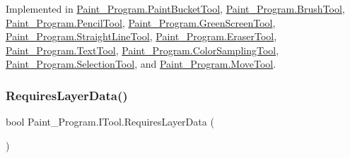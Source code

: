 Implemented in \mbox{\hyperlink{class_paint___program_1_1_paint_bucket_tool_a3841a712dff7c2887a4518d7602b627e}{Paint\+\_\+\+Program.\+Paint\+Bucket\+Tool}}, \mbox{\hyperlink{class_paint___program_1_1_brush_tool_a20c7beba691866bed3cea6a63400d005}{Paint\+\_\+\+Program.\+Brush\+Tool}}, \mbox{\hyperlink{class_paint___program_1_1_pencil_tool_ad59c1709d381a33f8363fd15f526eb0e}{Paint\+\_\+\+Program.\+Pencil\+Tool}}, \mbox{\hyperlink{class_paint___program_1_1_green_screen_tool_ad6be969ae981c34f5677e8a5bd537ef6}{Paint\+\_\+\+Program.\+Green\+Screen\+Tool}}, \mbox{\hyperlink{class_paint___program_1_1_straight_line_tool_ab823dd700a2a92df78fe73b25c129c14}{Paint\+\_\+\+Program.\+Straight\+Line\+Tool}}, \mbox{\hyperlink{class_paint___program_1_1_eraser_tool_aac92273a8f10a9f9cee6e03b1337f1c5}{Paint\+\_\+\+Program.\+Eraser\+Tool}}, \mbox{\hyperlink{class_paint___program_1_1_text_tool_a0b77db4478e19cd1f957c37af981fbf5}{Paint\+\_\+\+Program.\+Text\+Tool}}, \mbox{\hyperlink{class_paint___program_1_1_color_sampling_tool_a3365d954290cfb30d73c8a7c50fa7b72}{Paint\+\_\+\+Program.\+Color\+Sampling\+Tool}}, \mbox{\hyperlink{class_paint___program_1_1_selection_tool_aa271d61b0d9c182e9bba5fab0b2893eb}{Paint\+\_\+\+Program.\+Selection\+Tool}}, and \mbox{\hyperlink{class_paint___program_1_1_move_tool_a64daa79217e1cadfa6ddc865369298ba}{Paint\+\_\+\+Program.\+Move\+Tool}}.

\mbox{\label{interface_paint___program_1_1_i_tool_a6d45b6c48da8130ae41db3a66cdaef9a}} 
\subsubsection{\texorpdfstring{Requires\+Layer\+Data()}{RequiresLayerData()}}
{\footnotesize\ttfamily bool Paint\+\_\+\+Program.\+I\+Tool.\+Requires\+Layer\+Data (\begin{DoxyParamCaption}{ }\end{DoxyParamCaption})}



